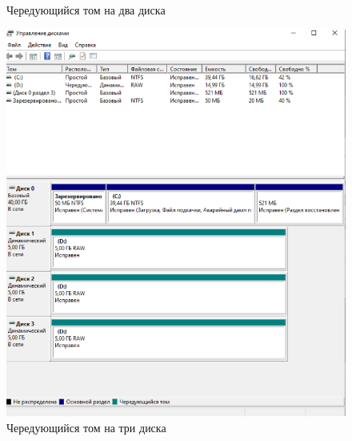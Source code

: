 \documentclass[a4paper,14pt]{extarticle}
\begin{document}
\begin{figure}[h]
\begin{center}
\begin{minipage}[h]{0.42\linewidth}
			\caption{Чередующийся том на два диска}
			\label{ris:chain2}
		\end{minipage}
	\end{center}
\end{figure}



\begin{figure}[h]
	\begin{center}
		\begin{minipage}[h]{0.48\linewidth}
			\includegraphics[width=1\linewidth]{images/chain3}
			\caption{Чередующийся том на три диска} %
			\label{ris:chain3} %
		\end{minipage}
		\hfill
		\begin{minipage}[h]{0.48\linewidth}

\end{minipage}
\end{center}
\end{figure}
\end{document}
